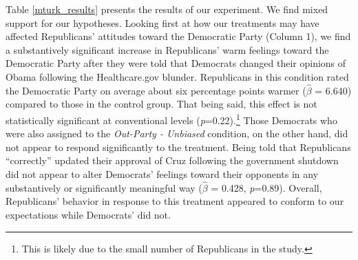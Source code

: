 \documentclass[12pt, letterpaper]{article}
\begin{document}
Table \ref{mturk_results} presents the results of our experiment. We find mixed support for our hypotheses. Looking first at how our treatments may have affected Republicans' attitudes toward the Democratic Party (Column 1), we find a substantively significant increase in Republicans' warm feelings toward the Democratic Party after they were told that Democrats changed their opinions of Obama following the Healthcare.gov blunder. Republicans in this condition rated the Democratic Party on average about six percentage points warmer ($\hat{\beta}$ = 6.640) compared to those in the control group. That being said, this effect is not statistically significant at conventional levels (\textit{p}=0.22).\footnote{This is likely due to the small number of Republicans in the study.} Those Democrats who were also assigned to the \textit{Out-Party - Unbiased} condition, on the other hand, did not appear to respond significantly to the treatment. Being told that Republicans  ``correctly'' updated their approval of Cruz following the government shutdown did not appear to alter Democrats' feelings toward their opponents in any substantively or significantly meaningful way ($\hat{\beta}$ = 0.428, \textit{p}=0.89). Overall, Republicans' behavior in response to this treatment appeared to conform to our expectations while Democrats' did not.
\end{document}
